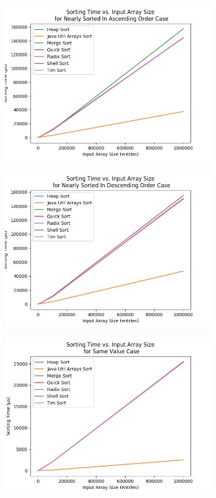 \begin{figure}[!htp]
\centering
\includegraphics[width=9cm]{figures/plots_without_BubbleSort_InsertionSort/sorting_time_vs_input_array_size_NearlySortedInAscendingOrderCase.png}
\end{figure}

\begin{figure}[!htp]
\centering
\includegraphics[width=9cm]{figures/plots_without_BubbleSort_InsertionSort/sorting_time_vs_input_array_size_NearlySortedInDescendingOrderCase.png}
\end{figure}

\begin{figure}[!htp]
\centering
\includegraphics[width=9cm]{figures/plots_without_BubbleSort_InsertionSort/sorting_time_vs_input_array_size_SameValueCase.png}
\end{figure}
